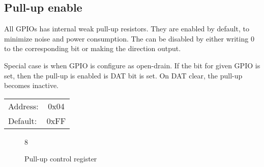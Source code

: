\documentclass{article}
\begin{document}
	\subsection{Pull-up enable}
	
	All GPIOs has internal weak pull-up resistors. They are enabled by default, to minimize
	noise and power consumption. The can be disabled by either writing 0 to the corresponding
	bit or making the direction output.
	\par
	Special case is when GPIO is configure as open-drain. If the bit for given GPIO is set, then
	the pull-up is enabled is DAT bit is set. On DAT clear, the pull-up becomes inactive. 
	
	\begin{tabular}{ l c }
		Address: & 0x04 \\
		Default: & 0xFF \\
	\end{tabular}
	
	\begin{figure}[H]
		\centering
		\begin{bytefield}[
			bitwidth=0.1\linewidth]{8}
			 \\
		\end{bytefield}
		\caption{Pull-up control register}
		\label{reg:pullup}
	\end{figure}
	
\end{document}
